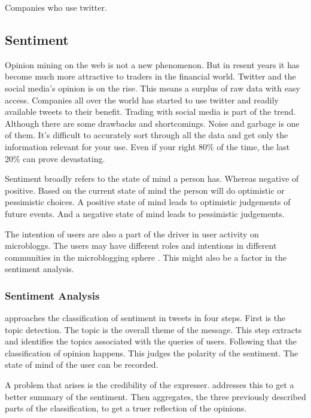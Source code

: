 Companies who use twitter. \cite[]{annikajubbega11:twitter_driver_stock_price}

\subsection{Sentiment}

Opinion mining on the web is not a new phenomenon. But in resent years it has
become much more attractive to traders in the financial world. Twitter and the
social media's opinion is on the rise. This means a surplus of raw data with
easy access. Companies all over the world has started to use twitter and
readily available tweets to their benefit. Trading with social media is part of
the trend. Although there are some drawbacks and shortcomings. Noise and
garbage is one of them. It's difficult to accurately sort through all the data
and get only the information relevant for your use. Even if your right 80\% of
the time, the last 20\% can prove devastating.
\cite[]{stevenson12:social_media_stock_pickers}

Sentiment broadly refers to the state of mind a person has. Whereas negative of
positive. Based on the current state of mind the person will do optimistic or
pessimistic choices. A positive state of mind leads to optimistic judgements of
future events. And a negative state of mind leads to pessimistic judgements.
\cite[p4]{doukas10:sentiment_and_momentum}

The intention of users are also a part of the driver in user activity on
microbloggs. The users may have different roles and intentions in different
communities in the microblogging sphere \cite[]{java07}. This might also be a
factor in the sentiment analysis.

\subsubsection{Sentiment Analysis}
\cite[]{Li2013206} approaches the classification of sentiment in tweets in four
steps. First is the topic detection. The topic is the overall theme of the
message. This step extracts and identifies the topics associated with the
queries of users. Following that the classification of opinion happens. This
judges the polarity of the sentiment. The state of mind of the user can be
recorded.

A problem that arises is the credibility of the expresser. \cite[]{Li2013206} addresses this to
get a better summary of the sentiment. Then aggregates, the
three previously described parts of the classification, to get a truer
reflection of the opinions.

